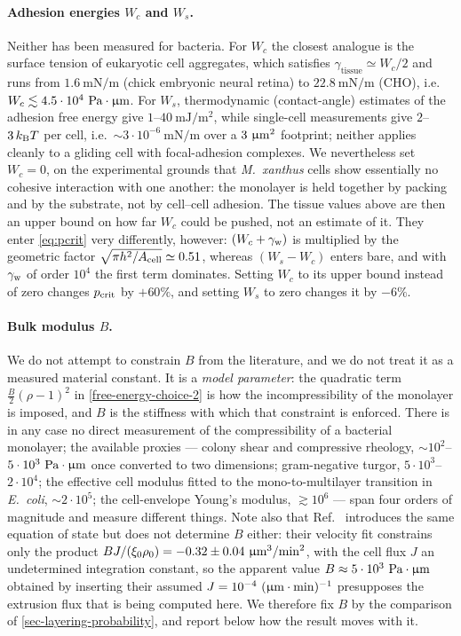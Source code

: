 \documentclass[a5paper]{article}
\begin{document}
\paragraph{Adhesion energies $W_c$ and $W_s$.} Neither has been measured for bacteria. For $W_c$ the closest analogue is the surface tension of eukaryotic cell aggregates, which satisfies $\gamma_\mathrm{tissue}\simeq W_c/2$ and runs from $1.6~\mathrm{mN/m}$ (chick embryonic neural retina) to $22.8~\mathrm{mN/m}$ (CHO), i.e.\ $W_c \lesssim 4.5\cdot10^{4}~\text{Pa}\cdot\upmu\mathrm{m}$. For $W_s$, thermodynamic (contact-angle) estimates of the adhesion free energy give $1$--$40~\mathrm{mJ/m^2}$, while single-cell measurements give $2$--$3\,k_\mathrm{B} T$ per cell, i.e.\ $\sim3\cdot10^{-6}~\mathrm{mN/m}$ over a $3~\upmu\mathrm{m}^2$ footprint; neither applies cleanly to a gliding cell with focal-adhesion complexes. We nevertheless set $W_c = 0$, on the experimental grounds that \emph{M.\ xanthus} cells show essentially no cohesive interaction with one another: the monolayer is held together by packing and by the substrate, not by cell--cell adhesion. The tissue values above are then an upper bound on how far $W_c$ could be pushed, not an estimate of it. They enter \eqref{eq:pcrit} very differently, however: $(W_c+\gamma_{\rm w})$ is multiplied by the geometric factor $\sqrt{\pi h^2/A_{\text{cell}}}\simeq0.51$, whereas $(W_s-W_c)$ enters bare, and with $\gamma_{\rm w}$ of order $10^{4}$ the first term dominates. Setting $W_c$ to its upper bound instead of zero changes $p_{\text{crit}}$ by $+60\%$, and setting $W_s$ to zero changes it by $-6\%$.

\paragraph{Bulk modulus $B$.} We do not attempt to constrain $B$ from the literature, and we do not treat it as a measured material constant. It is a \emph{model parameter}: the quadratic term $\tfrac{B}{2}(\rho-1)^2$ in \eqref{free-energy-choice-2} is how the incompressibility of the monolayer is imposed, and $B$ is the stiffness with which that constraint is enforced. There is in any case no direct measurement of the compressibility of a bacterial monolayer; the available proxies --- colony shear and compressive rheology, $\sim10^{2}$--$5\cdot10^{3}~\text{Pa}\cdot\upmu\mathrm{m}$ once converted to two dimensions; gram-negative turgor, $5\cdot10^{3}$--$2\cdot10^{4}$; the effective cell modulus fitted to the mono-to-multilayer transition in \emph{E.\ coli}, $\sim2\cdot10^{5}$; the cell-envelope Young's modulus, $\gtrsim10^{6}$ --- span four orders of magnitude and measure different things. Note also that Ref.~\cite{copenhagen} introduces the same equation of state but does not determine $B$ either: their velocity fit constrains only the product $BJ/(\xi_0\rho_0) = -0.32\pm0.04~\upmu\mathrm{m}^3/\mathrm{min}^2$, with the cell flux $J$ an undetermined integration constant, so the apparent value $B\approx5\cdot10^{3}~\text{Pa}\cdot\upmu\mathrm{m}$ obtained by inserting their assumed $J=10^{-4}~(\upmu\mathrm{m}\cdot\mathrm{min})^{-1}$ presupposes the extrusion flux that is being computed here. We therefore fix $B$ by the comparison of \cref{sec-layering-probability}, and report below how the result moves with it.
\end{document}
